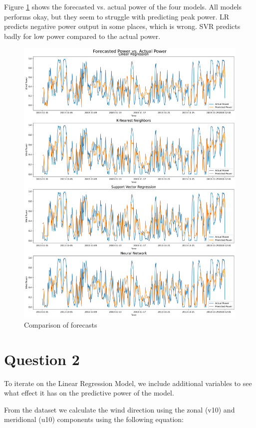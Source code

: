 \documentclass[a4paper, article, oneside, USenglish, IN5460]{memoir}
\begin{document}
Figure \ref{fig:q1-forecast-comparison}  shows the forecasted vs. actual power of the four models. All models performs okay, but they seem to struggle with predicting peak power. LR predicts negative power output in some places, which is wrong. SVR predicts badly for low power compared to the actual power. 
\begin{figure}[H]
    \centering
    \includegraphics[width=1\linewidth]{fig/q1-ALL-forecast.png}
    \caption{Comparison of forecasts }
    \label{fig:q1-forecast-comparison}
\end{figure}


\chapter*{Question 2}

To iterate on the Linear Regression Model, we include additional variables to see what effect it has on the predictive power of the model.

From the dataset we calculate the wind direction using the zonal (v10) and meridional (u10) components using the following equation:
\end{document}
